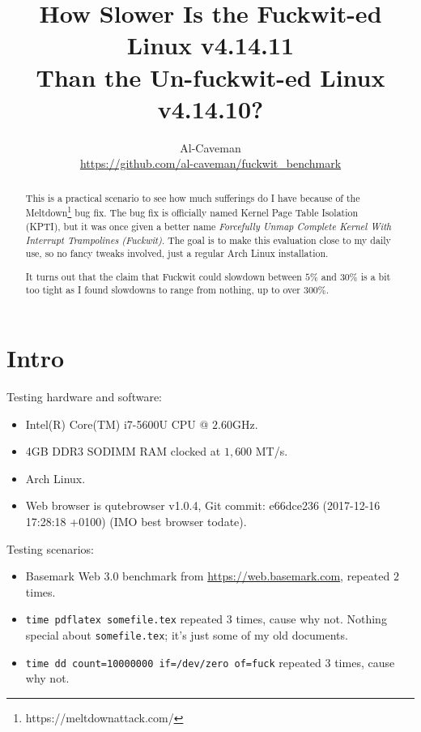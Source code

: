 \documentclass[12pt,a4paper,onecolumn, openright]{article}
\title{How Slower Is the Fuckwit-ed Linux v4.14.11\\
Than the Un-fuckwit-ed Linux v4.14.10?}
\author{Al-Caveman\\\url{https://github.com/al-caveman/fuckwit_benchmark}}
\begin{document}
\maketitle
\begin{abstract}
This is a practical scenario to see how much sufferings do I have because of
the Meltdown\footnote{https://meltdownattack.com/} bug fix. The bug fix is
officially named Kernel Page Table Isolation (KPTI), but it was once given a
better name \emph{Forcefully Unmap Complete Kernel With Interrupt Trampolines
(Fuckwit)}. The goal is to make this evaluation close to my daily use, so no
fancy tweaks involved, just a regular Arch Linux installation.

It turns out that the claim that Fuckwit could slowdown between $5\%$ and
$30\%$ is a bit too tight as I found slowdowns to range from nothing, up to
over $300\%$.
\end{abstract}

\section{Intro}
Testing hardware and software:
\begin{itemize}
    \item Intel(R) Core(TM) i7-5600U CPU @ $2.60$GHz.
    \item 4GB DDR3 SODIMM RAM clocked at $1,600$ MT/s.
    \item Arch Linux.
    \item Web browser is qutebrowser v1.0.4, Git commit: e66dce236 (2017-12-16
    17:28:18 +0100) (IMO best browser todate).
\end{itemize}
Testing scenarios:
\begin{itemize}
    \item Basemark Web 3.0 benchmark from \url{https://web.basemark.com},
    repeated $2$ times.
    \item \texttt{time pdflatex somefile.tex} repeated $3$ times, cause why
    not. Nothing special about \texttt{somefile.tex}; it's just some of my old
    documents.
    \item \texttt{time dd count=10000000 if=/dev/zero of=fuck} repeated $3$
    times, cause why not.
\end{itemize}
\end{document}
